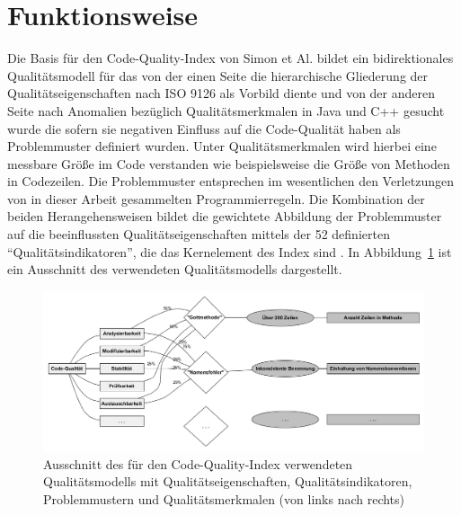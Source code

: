 \documentclass[da,ngerman]{stthesis}
\begin{document}
		\section{Funktionsweise}
			Die Basis für den Code-Quality-Index von Simon et Al. bildet ein bidirektionales Qualitätsmodell für das von der einen Seite die hierarchische Gliederung der Qualitätseigenschaften nach ISO 9126 als Vorbild diente und von der anderen Seite nach Anomalien bezüglich Qualitätsmerkmalen in Java und C++ gesucht wurde die sofern sie negativen Einfluss auf die Code-Qualität haben als Problemmuster definiert wurden. Unter Qualitätsmerkmalen wird hierbei eine messbare Größe im Code verstanden wie beispielsweise die Größe von Methoden in Codezeilen. Die Problemmuster entsprechen im wesentlichen den Verletzungen von in dieser Arbeit gesammelten Programmierregeln. Die Kombination der beiden Herangehensweisen bildet die gewichtete Abbildung der Problemmuster auf die beeinflussten Qualitätseigenschaften mittels der 52 definierten "`Qualitätsindikatoren"', die das Kernelement des Index sind \cite{CodeQualityManagement}. In Abbildung~\ref{qualitymodel} ist ein Ausschnitt des verwendeten Qualitätsmodells dargestellt. \newline 
			\begin{figure} [h]
				\centering
				\includegraphics [width=\textwidth] {model.png}
				\caption{Ausschnitt des für den Code-Quality-Index verwendeten Qualitätsmodells mit Qualitätseigenschaften, Qualitätsindikatoren, Problemmustern und Qualitätsmerkmalen (von links nach rechts)}
				\label{qualitymodel}
			\end{figure}
\end{document}
